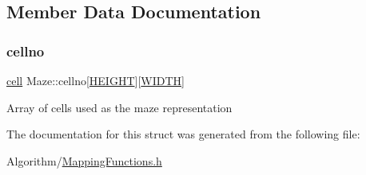 \subsection{Member Data Documentation}
\mbox{\label{structMaze_ae37dc660fb366743f092d44446bc3733}} 
\subsubsection{\texorpdfstring{cellno}{cellno}}
{\footnotesize\ttfamily \hyperlink{structcell}{cell} Maze\+::cellno\mbox{[}\hyperlink{MappingFunctions_8h_aed89bd71aee8be823e8a20ec4e093c1e}{H\+E\+I\+G\+HT}\mbox{]}\mbox{[}\hyperlink{MappingFunctions_8h_a241aeeb764887ae5e3de58b98f04b16d}{W\+I\+D\+TH}\mbox{]}}

Array of cells used as the maze representation 

The documentation for this struct was generated from the following file\+:\begin{DoxyCompactItemize}
\item 
Algorithm/\hyperlink{MappingFunctions_8h}{Mapping\+Functions.\+h}\end{DoxyCompactItemize}
